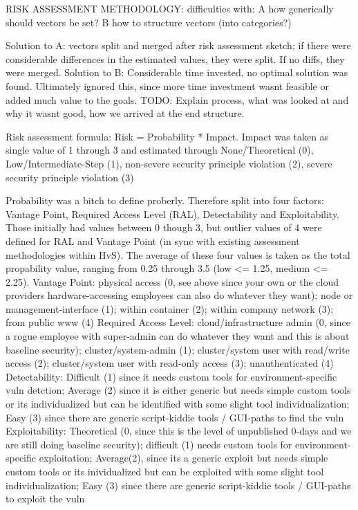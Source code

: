 RISK ASSESSMENT METHODOLOGY:
difficulties with: 
A how generically should vectors be set?
B how to structure vectors (into categories?) 

Solution to A: vectors split and merged after risk assessment sketch; if there were considerable differences in the estimated values, they were split. If no diffs, they were merged.
Solution to B: Considerable time invested, no optimal solution was found. Ultimately ignored this, since more time investment wasnt feasible or added much value to the goals. TODO: Explain process, what was looked at and why it wasnt good, how we arrived at the end structure.

Risk assessment formula:
Risk = Probability * Impact.
Impact was taken as single value of 1 through 3  and estimated through None/Theoretical (0), Low/Intermediate-Step (1), non-severe security principle violation (2), severe security principle violation (3)

Probability was a bitch to define proberly. Therefore split into four factors: Vantage Point, Required Access Level (RAL), Detectability and Exploitability. Those initially had values between 0 though 3, but outlier values of 4  were defined for RAL and Vantage Point (in sync with existing assessment methodologies within HvS).
The average of these four values is taken as the total propability value, ranging from 0.25 through 3.5 (low <= 1.25, medium <= 2.25).
Vantage Point: physical access (0, see above since your own or the cloud providers hardware-accessing employees can also do whatever they want); node or management-interface (1); within container (2); within company network (3); from public www (4)
Required Access Level: cloud/infrastructure admin (0, since a rogue employee with super-admin can do whatever they want and this is about baseline security); cluster/system-admin (1); cluster/system user with read/write access (2); cluster/system user with read-only access (3); unauthenticated (4)
Detectability: Difficult (1) since it needs custom tools for environment-specific vuln detction; Average (2) since it is either generic but needs simple custom tools or its individualized but can be identified with some slight tool individualization; Easy (3) since there are generic script-kiddie tools / GUI-paths to find the vuln
Exploitability: Theoretical (0, since this is the level of unpublished 0-days and we are still doing baseline security); difficult (1) needs custom tools for environment-specific exploitation; Average(2), since its a generic exploit but needs simple custom tools or its inividualized but can be exploited with some slight tool individualization; Easy (3) since there are generic script-kiddie tools / GUI-paths to exploit the vuln

